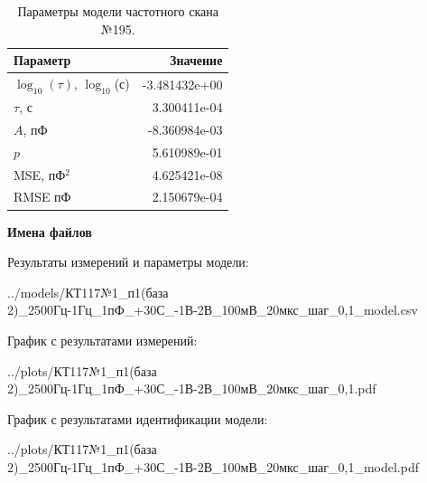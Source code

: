 \begin{table}[!ht]
    \centering
    \caption{Параметры модели частотного скана №195.}
    \begin{tabular}{|l|r|}
        \hline
        Параметр                                       & Значение                  \\ \hline
        $\log_{10}(\tau)$, $\log_{10}$(с)              & -3.481432e+00             \\ \hline
        $\tau$, с                                      & 3.300411e-04              \\ \hline
        $A$, пФ                                        & -8.360984e-03             \\ \hline
        $p$                                            & 5.610989e-01              \\ \hline
        MSE, пФ$^2$                                    & 4.625421e-08              \\ \hline
        RMSE пФ                                        & 2.150679e-04              \\ \hline
    \end{tabular}
    \label{table:frequency_scan_model_195}
\end{table}

\textbf{Имена файлов}

Результаты измерений и параметры модели:

\scriptsize../models/КТ117№1\_п1(база 2)\_2500Гц-1Гц\_1пФ\_+30С\_-1В-2В\_100мВ\_20мкс\_шаг\_0,1\_model.csv
\normalsize

График с результатами измерений:

\scriptsize../plots/КТ117№1\_п1(база 2)\_2500Гц-1Гц\_1пФ\_+30С\_-1В-2В\_100мВ\_20мкс\_шаг\_0,1.pdf
\normalsize

График с результатами идентификации модели:

\scriptsize../plots/КТ117№1\_п1(база 2)\_2500Гц-1Гц\_1пФ\_+30С\_-1В-2В\_100мВ\_20мкс\_шаг\_0,1\_model.pdf
\normalsize

